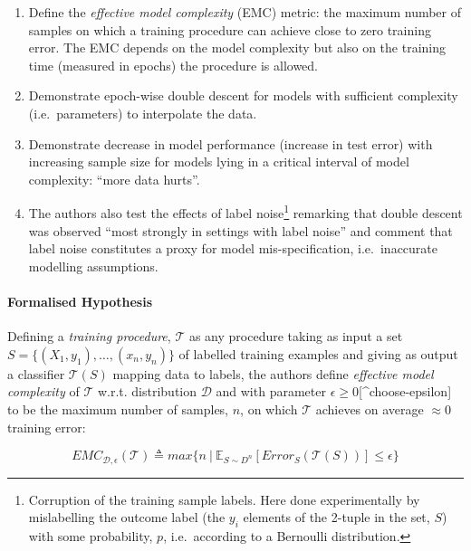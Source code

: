 \documentclass[]{article}
\providecommand{\tightlist}{%
  \setlength{\itemsep}{0pt}\setlength{\parskip}{0pt}}
\let\oldparagraph\paragraph
\renewcommand{\paragraph}[1]{\oldparagraph{#1}\mbox{}}
\begin{document}
\begin{enumerate}
\def\labelenumi{\arabic{enumi}.}
\setcounter{enumi}{1}
\tightlist
\item
  Define the \emph{effective model complexity} (EMC) metric: the maximum
  number of samples on which a training procedure can achieve close to
  zero training error. The EMC depends on the model complexity but also
  on the training time (measured in epochs) the procedure is allowed.\\
\item
  Demonstrate epoch-wise double descent for models with sufficient
  complexity (i.e.~parameters) to interpolate the data.\\
\item
  Demonstrate decrease in model performance (increase in test error)
  with increasing sample size for models lying in a critical interval of
  model complexity: ``more data hurts''.
\item
  The authors also test the effects of label noise\footnote{Corruption
    of the training sample labels. Here done experimentally by
    mislabelling the outcome label (the \(y_i\) elements of the 2-tuple
    in the set, \(S\)) with some probability, \(p\), i.e.~according to a
    Bernoulli distribution.} remarking that double descent was observed
  ``most strongly in settings with label noise'' and comment that label
  noise constitutes a proxy for model mis-specification, i.e.~inaccurate
  modelling assumptions.
\end{enumerate}

\hypertarget{formalised-hypothesis}{%
\paragraph{Formalised Hypothesis}\label{formalised-hypothesis}}

Defining a \emph{training procedure}, \(\mathcal{T}\) as any procedure
taking as input a set \(S = \{(X_1, y_1), \dots, (x_n, y_n)\}\) of
labelled training examples and giving as output a classifier
\(\mathcal{T}(S)\) mapping data to labels, the authors define
\emph{effective model complexity} of \(\mathcal{T}\) w.r.t. distribution
\(\mathcal{D}\) and with parameter
\(\epsilon \geq 0\){[}\^{}choose-epsilon{]} to be the maximum number of
samples, \(n\), on which \(\mathcal{T}\) achieves on average
\(\approx 0\) training error:

\[EMC_{\mathcal{D}, \epsilon}(\mathcal{T}) \triangleq max\{n\ \vert\ \mathbb{E}_{S \sim D^n}[Error_S(\mathcal{T}(S))] \leq \epsilon \}\]
\end{document}

